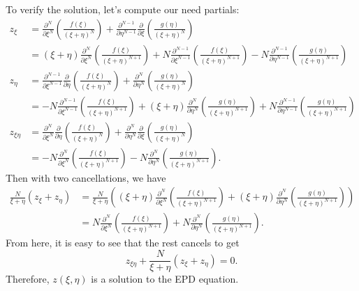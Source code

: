 \documentclass[a4paper,12pt]{article}
\begin{document}
\begin{enumerate}[label = \arabic*.]
\begin{enumerate}[label = (\alph*)]
		To verify the solution, let's compute our need partials:
		\begin{align*}
			z_\xi &= \frac{\partial^{N}}{\partial \xi^{N}} \left(\frac{f(\xi)}{(\xi + \eta)^N}\right) + \frac{\partial^{N - 1}}{\partial \eta^{N - 1}}\frac{\partial}{\partial \xi} \left(\frac{g(\eta)}{(\xi + \eta)^N}\right) \\
			&= (\xi + \eta)\frac{\partial^{N}}{\partial \xi^{N}} \left(\frac{f(\xi)}{(\xi + \eta)^{N + 1}}\right) + N\frac{\partial^{N - 1}}{\partial \xi^{N - 1}} \left(\frac{f(\xi)}{(\xi + \eta)^{N + 1}}\right) - N \frac{\partial^{N - 1}}{\partial \eta^{N - 1}} \left(\frac{g(\eta)}{(\xi + \eta)^{N + 1}}\right) \\
			z_\eta &= \frac{\partial^{N - 1}}{\partial \xi^{N - 1}} \frac{\partial}{\partial \eta}\left(\frac{f(\xi)}{(\xi + \eta)^N}\right) + \frac{\partial^{N}}{\partial \eta^{N}} \left(\frac{g(\eta)}{(\xi + \eta)^N}\right) \\
			&= -N\frac{\partial^{N - 1}}{\partial \xi^{N - 1}} \left(\frac{f(\xi)}{(\xi + \eta)^{N + 1}}\right) + (\xi + \eta)\frac{\partial^{N}}{\partial \eta^{N}} \left(\frac{g(\eta)}{(\xi + \eta)^{N + 1}}\right) + N\frac{\partial^{N - 1}}{\partial \eta^{N - 1}} \left(\frac{g(\eta)}{(\xi + \eta)^{N + 1}}\right) \\
			z_{\xi \eta} &= \frac{\partial^{N}}{\partial \xi^{N}} \frac{\partial}{\partial \eta} \left(\frac{f(\xi)}{(\xi + \eta)^N}\right) + \frac{\partial^{N}}{\partial \eta^{N}} \frac{\partial}{\partial \xi} \left(\frac{g(\eta)}{(\xi + \eta)^N}\right) \\
			&=-N\frac{\partial^{N}}{\partial \xi^{N}} \left(\frac{f(\xi)}{(\xi + \eta)^{N + 1}}\right) - N\frac{\partial^{N}}{\partial \eta^{N}} \left(\frac{g(\eta)}{(\xi + \eta)^{N + 1}}\right).
		\end{align*}
		Then with two cancellations, we have
		\begin{align*}
			\frac{N}{\xi + \eta} (z_\xi + z_\eta) &= \frac{N}{\xi + \eta} \left((\xi + \eta)\frac{\partial^{N}}{\partial \xi^{N}} \left(\frac{f(\xi)}{(\xi + \eta)^{N + 1}}\right) + (\xi + \eta)\frac{\partial^{N}}{\partial \eta^{N}} \left(\frac{g(\eta)}{(\xi + \eta)^{N + 1}}\right)\right) \\
			&= N\frac{\partial^{N}}{\partial \xi^{N}} \left(\frac{f(\xi)}{(\xi + \eta)^{N + 1}}\right) + N\frac{\partial^{N}}{\partial \eta^{N}} \left(\frac{g(\eta)}{(\xi + \eta)^{N + 1}}\right).
		\end{align*}
		From here, it is easy to see that the rest cancels to get
		\[
			z_{\xi \eta} + \frac{N}{\xi + \eta} (z_\xi + z_\eta) = 0.
		\]
		Therefore, $ z(\xi, \eta) $ is a solution to the EPD equation.
		

\end{enumerate}
\end{enumerate}
\end{document}
